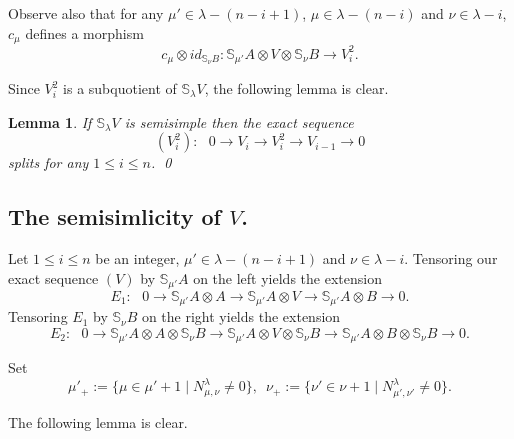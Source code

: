 \documentclass{amsart}
\newtheorem{lemma}[theorem]{Lemma}
\theoremstyle{definition}
\newcommand{\ot}{\otimes}
\begin{document}
Observe also that for any $\mu'\in \lambda-(n-i+1)$, $\mu\in
\lambda-(n-i)$ and $\nu\in \lambda-i$, $c_{\mu}$ defines a morphism
$$c_{\mu}\ot id_{\mathbb{S}_{\nu} B}
:\mathbb{S}_{\mu'} A\ot V\ot \mathbb{S}_{\nu} B\to V_{i}^2.$$

Since $V_{i}^2$ is a subquotient of $\mathbb{S}_{\lambda}V$, the
following lemma is clear.
\begin{lemma}\label{splits}
If $\mathbb{S}_{\lambda}V$ is semisimple then the exact sequence
\begin{equation}\label{(V^2)}
(V_{i}^2):\,\,\,\, 0 \xrightarrow{} V_{i}\xrightarrow{} V_{i}^2
\xrightarrow{} V_{i-1}\xrightarrow{} 0
\end{equation}
splits for any $1\le i\le n$. \qed
\end{lemma}

\subsection{The semisimlicity of $V$.}
Let $1\le i\le n$ be an integer,
$\mu'\in \lambda-(n-i+1)$ and $\nu\in \lambda-i$. Tensoring our
exact sequence $(V)$ by $\mathbb{S}_{\mu'}A$ on the left yields the
extension
\begin{equation}\label{exseq1}
E_1:\,\,\,\, 0\xrightarrow{} \mathbb{S}_{\mu'}A\ot A\xrightarrow{}
\mathbb{S}_{\mu'}A\ot V\xrightarrow{}\mathbb{S}_{\mu'}A\ot
B\xrightarrow{}0.
\end{equation}
Tensoring $E_1$ by $\mathbb{S}_{\nu}B$ on the right yields the
extension
\begin{equation}\label{exseq2}
E_2:\,\,\,\, 0\xrightarrow{} \mathbb{S}_{\mu'}A\ot A\ot
\mathbb{S}_{\nu}B\xrightarrow{} \mathbb{S}_{\mu'}A\ot V\ot
\mathbb{S}_{\nu}B\xrightarrow{}\mathbb{S}_{\mu'}A\ot B\ot
\mathbb{S}_{\nu}B\xrightarrow{}0.
\end{equation}

Set
\begin{equation}\label{munu}
\mu'_+:= \{\mu\in\mu'+1\mid N_{\mu,\nu}^{\lambda}\ne 0\},\,\,\,
\nu_+:= \{\nu'\in\nu+1\mid N_{\mu',\nu'}^{\lambda}\ne 0\}.
\end{equation}

The following lemma is clear.
\end{document}
